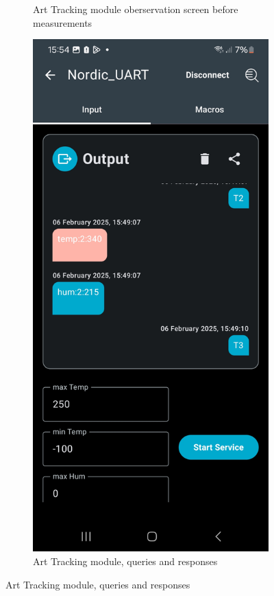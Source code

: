 \begin{figure}[ht!]
\begin{subfigure}{.4\linewidth}
	\caption{Art Tracking module oberservation screen before measurements}
	\label{f:Toolbox_art_tracking_empty}
\end{subfigure}
\hspace*{.1\linewidth}
\begin{subfigure}{.4\linewidth}
	\includegraphics[trim={0 4cm 0 3cm},clip, width=\linewidth]{graphics/nRF_toolbox_Bad_Value_2.jpg}
	\caption{Art Tracking module, queries and responses}
	\label{f:Toolbox_art_filled}
\end{subfigure}
\end{figure}



